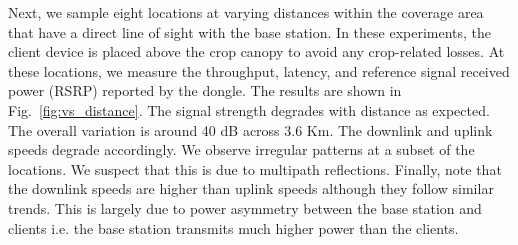  Next, we sample eight locations at varying distances within the coverage area that have a direct line of sight with the base station. In these experiments, the client device is placed above the crop canopy to avoid any crop-related losses. At these locations, we measure the throughput, latency, and reference signal received power (RSRP) reported by the dongle. The results are shown in Fig.~\ref{fig:vs_distance}. The signal strength degrades with distance as expected. The overall variation is around 40 dB across 3.6 Km. The downlink and uplink speeds degrade accordingly. We observe irregular patterns at a subset of the locations. We suspect that this is due to multipath reflections. Finally, note that the downlink speeds are higher than uplink speeds although they follow similar trends. This is largely due to power asymmetry between the base station and clients i.e. the base station transmits much higher power than the clients.



\begin{figure*}[!t] %
    \centering
    \vspace{-0.15in}
\caption{Profiling the relationship between downlink, uplink, latency, and RSRP versus distance \textbf{without} crops.}

\label{fig:vs_distance}
    \vspace{-0.25in}
\end{figure*}

\begin{figure*}[!t] %
    \centering
    \hfill
    \hfill
    \hfill
\vspace{-0.15in}
\caption{Profiling the relationship between downlink, uplink, latency, and RSRP versus distance \textbf{through} crops.}
\vspace{-0.2in}
\label{fig:vs_distance_crops}
\end{figure*}

